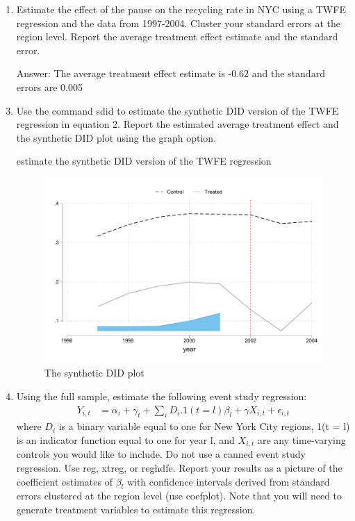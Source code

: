 \documentclass{article}
\begin{document}
\begin{enumerate}
    


    \item Estimate the effect of the pause on the recycling rate in NYC using a TWFE regression and the data from 1997-2004. Cluster your standard errors at the region level. Report the average treatment effect estimate and the standard error.
          \item[Answer:] The average treatment effect estimate is -0.62 and the standard errors are 0.005
    


    \item Use the command sdid to estimate the synthetic DID version of the TWFE regression in equation 2. Report the estimated average treatment effect and the synthetic DID plot using the graph option.
       
    \begin{table}[ht]
    \centering
    
    \caption{estimate the synthetic DID version of the TWFE regression}
    \label{tab:q3_sdid}
    \end{table}

    \begin{figure}[ht]
    \centering
    \includegraphics[scale = 0.7]{sdid_graphtrends2002.pdf}
    \caption{The synthetic DID plot}
    \label{fig:sdid_graphtrends2002}
    \end{figure}


    \item Using the full sample, estimate the following event study regression:
    \begin{align}
    Y_{i,t} &= \alpha_{i} + \gamma_{t} + \sum_{i} D_{i}.1(t = l) \beta_{l}+ \gamma X_{i,t}  + \epsilon_{i,t}
    \end{align}
    where  $D_{i}$ is a binary variable equal to one for New York City regions, 1(t = l) is an indicator function equal to one for year l, and $X_{i,t}$ are any time-varying controls you would like to include. Do not use a canned event study regression. Use reg, xtreg, or reghdfe. Report your results as a picture of the coefficient estimates of $\beta_{l}$ with confidence intervals derived from standard errors clustered at the region level (use coefplot). Note that you will need to generate treatment variables to estimate this regression.


\end{enumerate}
\end{document}
